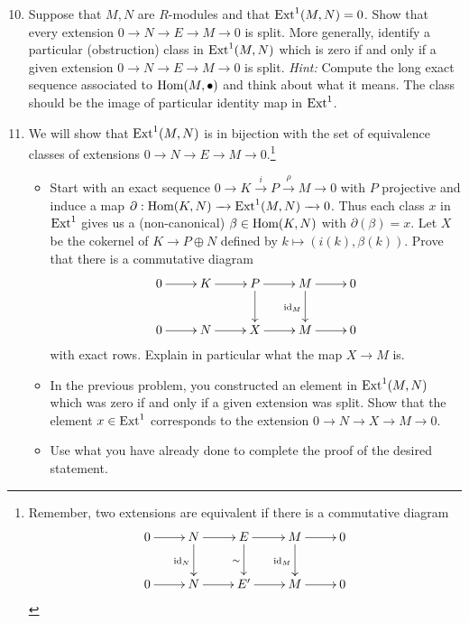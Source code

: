 \documentclass[11pt]{amsart}
\theoremstyle{theorem}
\renewcommand{\to}[1][]{\xrightarrow{\ #1\ }}
\newcommand{\Hom}{\textnormal{Hom}}
\newcommand{\Ext}{\textnormal{Ext}}
\newcommand{\id}{\textnormal{id}}
\begin{document}
\begin{enumerate}
\setcounter{enumi}{9}
\item Suppose that $M, N$ are $R$-modules and that $\Ext^1(M, N) = 0$.  Show that every extension $0 \to N \to E \to M \to 0$ is split.  More generally, identify a particular (obstruction) class in $\Ext^1(M, N)$ which is zero if and only if a given extension $0 \to N \to E \to M \to 0$ is split.
    \vskip 3pt
    \emph{Hint:} Compute the long exact sequence associated to $\Hom(M, \bullet)$ and think about what it means.   The class should be the image of particular identity map in $\Ext^1$.  
\vskip 6pt
\item We will show that $\Ext^1(M, N)$ is in bijection with the set of equivalence classes of extensions $0 \to N \to E \to M \to 0$.\footnote{Remember, two extensions are equivalent if there is a commutative diagram 
    \[
        \xymatrix{
            0 \ar[r] & N \ar[d]_{\id_N} \ar[r] & E \ar[d]_{\sim} \ar[r] & M \ar[r] \ar[d]_{\id_M}  & 0 \\
            0 \ar[r] & N \ar[r] & E' \ar[r] & M \ar[r] & 0 
            }
    \]}
    \begin{itemize}
    \item[(a)]  Start with an exact sequence $0 \to K \xrightarrow{i} P \xrightarrow{\rho} M \to 0$ with $P$ projective and induce a map $\partial : \Hom(K, N) \to \Ext^1(M, N) \to 0$.  Thus each class $x$ in $\Ext^1$ gives us a (non-canonical) $\beta \in \Hom(K, N)$ with $\partial(\beta) = x$.  Let $X$ be the cokernel of $K \to P \oplus N$ defined by $k \mapsto (i(k), \beta(k))$.  Prove that there is a commutative diagram
        \[
        \xymatrix{
            0 \ar[r] & K \ar[r] & P \ar[d] \ar[r] & M \ar[d]_{\id_M} \ar[r] & 0 \\
            0 \ar[r] & N \ar[r] & X \ar[r] & M \ar[r] & 0 
        }
        \]
        with exact rows.  Explain in particular what the map $X \to M$ is.  
    \item[(b)]  In the previous problem, you constructed an element in $\Ext^1(M, N)$ which was zero if and only if a given extension was split.  Show that the element $x \in \Ext^1$ corresponds to the extension $0 \to N \to X \to M \to 0$.  
    \item[(c)]  Use what you have already done to complete the proof of the desired statement.  
    \end{itemize}
\end{enumerate}
\end{document}
